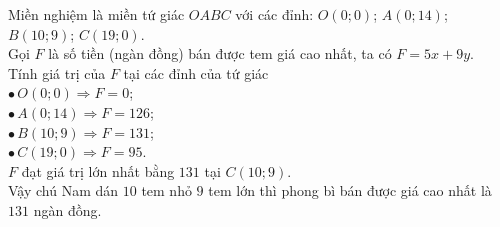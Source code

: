 \begin{bt}
{\begin{center}
		\end{center}
	Miền nghiệm là miền tứ giác $OABC$ với các đỉnh: $O(0;0)$; $A(0;14)$; $B(10;9)$; $C(19;0)$.\\
	Gọi $F$ là số tiền (ngàn đồng) bán được tem giá cao nhất, ta có $F=5x+9y$.\\
	Tính giá trị của $F$ tại các đỉnh của tứ giác\\
	$\bullet\,O(0;0)\Rightarrow F=0$;\\
	$\bullet\,A(0;14)\Rightarrow F=126$;\\
	$\bullet\,B(10;9)\Rightarrow F=131$;\\
	$\bullet\,C(19;0)\Rightarrow F=95$.\\
	$F$ đạt giá trị lớn nhất bằng $131$ tại $C(10;9)$.\\
	Vậy chú Nam dán $10$ tem nhỏ $9$ tem lớn thì phong bì bán được giá cao nhất là $131$ ngàn đồng.
	}
\end{bt}

